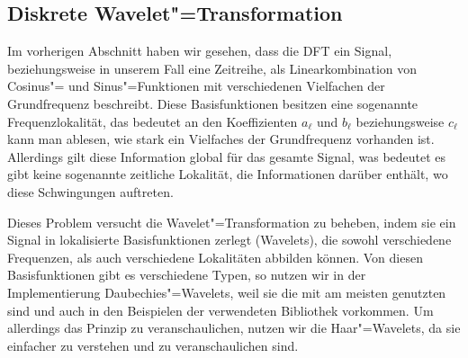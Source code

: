 \subsection{Diskrete Wavelet"=Transformation}
Im vorherigen Abschnitt haben wir gesehen, dass die \acs{DFT} ein Signal, beziehungsweise in unserem Fall eine Zeitreihe, als Linearkombination von Cosinus"= und Sinus"=Funktionen mit verschiedenen Vielfachen der Grundfrequenz beschreibt. Diese Basisfunktionen besitzen eine sogenannte Frequenzlokalität, das bedeutet an den Koeffizienten $a_\ell$ und $b_\ell$ beziehungsweise $c_\ell$ kann man ablesen, wie stark ein Vielfaches der Grundfrequenz vorhanden ist. Allerdings gilt diese Information global für das gesamte Signal, was bedeutet es gibt keine sogenannte zeitliche Lokalität, die Informationen darüber enthält, wo diese Schwingungen auftreten.

Dieses Problem versucht die Wavelet"=Transformation zu beheben, indem sie ein Signal in lokalisierte Basisfunktionen zerlegt (Wavelets), die sowohl verschiedene Frequenzen, als auch verschiedene Lokalitäten abbilden können. Von diesen Basisfunktionen gibt es verschiedene Typen, so nutzen wir in der Implementierung Daubechies"=Wavelets, weil sie die mit am meisten genutzten sind und auch in den Beispielen der verwendeten Bibliothek vorkommen. Um allerdings das Prinzip zu veranschaulichen, nutzen wir die Haar"=Wavelets, da sie einfacher zu verstehen und zu veranschaulichen sind.

